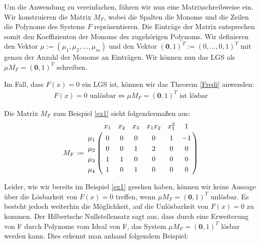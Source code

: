 \noindent Um die Anwendung zu vereinfachen, führen wir nun eine Matrixschreibweise ein. Wir konstruieren die Matrix $M_F$, wobei die Spalten die Monome und die Zeilen die Polynome des Systems $F$ repräsentieren. Die Einträge der Matrix entsprechen somit den Koeffizienten der Monome des zugehörigen Polynoms.  Wir definieren den Vektor $\mu := (\mu_1,\mu_2,\ldots,\mu_m)$ und den Vektor $(\textbf{0},1)^T:=(0,\ldots,0,1)^T$ mit genau der Anzahl der Monome an Einträgen. Wir können nun das LGS als $\mu M_F = (\textbf{0},1)^T$ schreiben. 
\begin{note}
Im Fall, dass $F(x)=0$ ein LGS ist, können wir das Theorem \ref{Fredi} anwenden: 
\begin{align*}
F(x)=0 \text{ unlösbar} \Leftrightarrow \mu M_F = (\textbf{0},1)^T \text{ ist lösbar}
\end{align*}
\end{note}  

\begin{example}
Die Matrix $M_F$ zum Beispiel \ref{ex1} sieht folgendermaßen aus: 
\begin{align*}
M_F := \bordermatrix{
	& x_{1} & x_2 & x_3 & x_1x_2 & x_1^2 & 1 \cr
	\mu_1 & 0 & 0 & 0 & 0 & 1 & -1 \cr
	\mu_2 & 0 & 0 & 1 & 2 & 0 & 0 \cr
	\mu_3 & 1 & 1 & 0 & 0 & 0 & 0 \cr
	\mu_4 & 1 & 0 & 1 & 0 & 0 & 0
}
\end{align*}
\end{example}


\noindent Leider, wie wir bereits im Beispiel \ref{ex1} gesehen haben, können wir keine Aussage über die Lösbarkeit von $F(x) = 0$ treffen, wenn
$\mu M_F = (\textbf{0},1)^T \text{ unlösbar}$. Es besteht jedoch weiterhin die Möglichkeit, auf die Unlösbarkeit von $F(x) = 0$ zu kommen. Der Hilbertsche Nullstellensatz sagt aus, dass durch eine Erweiterung von F durch Polynome vom Ideal von F, das System $\mu M_F = (\textbf{0},1)^T$ lösbar werden kann. Dies erkennt man anhand folgendem Beispiel:


